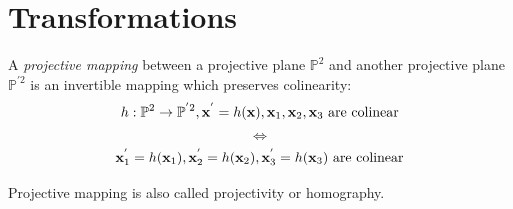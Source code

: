 \documentclass[12pt, a4paper]{report}
\newtheorem[style=M,bodystyle=\normalfont]{theorem}{Theorem}
\newtheorem[style=M,bodystyle=\normalfont]{corollary}{Corollary}
\newtheorem[style=M,bodystyle=\normalfont]{lemma}{Lemma}
\newtheorem[style=M,bodystyle=\normalfont]{definition}{Definition}
\begin{document}
    \section{Transformations}
    \begin{definition}
        A \emph{projective mapping} between a projective plane $\mathbb{P}^2$ and another projective plane $\mathbb{P}^{'2}$ is an invertible mapping which preserves colinearity:
        \[h:\mathbb{P}^2 \rightarrow \mathbb{P}^{'2}, \textbf{x}^{'}=h(\textbf{x}),\textbf{x}_1,\textbf{x}_2,\textbf{x}_3 \textnormal{ are colinear}\]
        \[\Leftrightarrow\]
        \[\textbf{x}_1^{'}=h(\textbf{x}_1),\textbf{x}_2^{'}=h(\textbf{x}_2),\textbf{x}_3^{'}=h(\textbf{x}_3) \textnormal{ are colinear}\]
    \end{definition}
    Projective mapping is also called projectivity or homography. 
\end{document}
